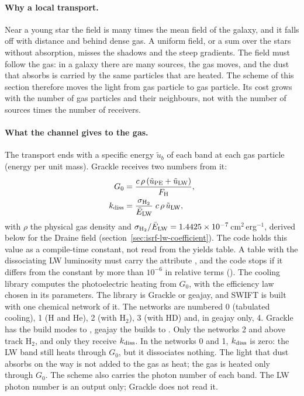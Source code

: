 \paragraph{Why a local transport.} Near a young star the field is many times
the mean field of the galaxy, and it falls off with distance and behind dense
gas. A uniform field, or a sum over the stars without absorption, misses the
shadows and the steep gradients. The field must follow the gas: in a galaxy
there are many sources, the gas moves, and the dust that absorbs is carried by
the same particles that are heated. The scheme of this section therefore
moves the light from gas particle to gas particle. Its cost grows with the
number of gas particles and their neighbours, not with the number of sources
times the number of receivers.

\paragraph{What the channel gives to the gas.} The transport ends with a
specific energy $\tilde u_b$ of each band at each gas particle (energy per unit
mass). Grackle receives two numbers from it:
\begin{align}
  G_0 &= \frac{c\,\rho\,(\tilde u_{\rm PE}+\tilde u_{\rm LW})}{F_{\rm H}},
  \label{eq:isrf-G0}\\
  k_{\rm diss} &= \frac{\sigma_{\rm H_2}}{\bar E_{\rm LW}}\;c\,\rho\,
  \tilde u_{\rm LW},
  \label{eq:isrf-kdiss}
\end{align}
with $\rho$ the physical gas density and
$\sigma_{\rm H_2}/\bar E_{\rm LW}=1.4425\times10^{-7}$\,cm$^2$\,erg$^{-1}$,
derived below for the Draine field (section~\ref{sec:isrf-lw-coefficient}).
The code holds this value as a compile-time constant, not read from the yields
table. A table with the dissociating LW luminosity must carry the attribute
, and the code stops if it differs from the
constant by more than $10^{-6}$ in relative terms
().
The cooling library computes the photoelectric heating from $G_0$, with the
efficiency law chosen in its parameters. The library is Grackle or geajay, and
SWIFT is built with one chemical network of it. The networks are numbered 0
(tabulated cooling), 1 (H and He), 2 (with H$_2$), 3 (with HD) and, in geajay
only, 4. Grackle has the build modes  to ,
geajay the builds  to . Only the networks 2 and
above track H$_2$, and only they receive $k_{\rm diss}$. In the networks 0 and
1, $k_{\rm diss}$ is zero: the LW band still heats through $G_0$, but it
dissociates nothing. The light that dust absorbs on the
way is not added to the gas as heat; the gas is heated only through $G_0$.
The scheme also carries the photon number of each band. The LW photon number
is an output only; Grackle does not read it.

